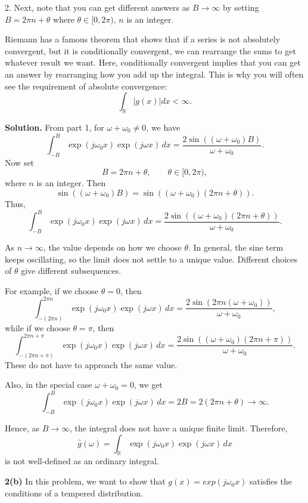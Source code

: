 \documentclass[11pt]{article}
\begin{document}
	\newpage
	
	2. Next, note that you can get different answers as $B \to \infty$ by setting $B = 2\pi n + \theta$ where $\theta \in [0, 2\pi)$, $n$ is an integer.
	
	Riemann has a famous theorem that shows that if a series is not absolutely convergent, but it is conditionally convergent, we can rearrange the sums to get whatever result we want. Here, conditionally convergent implies that you can get an answer by rearranging how you add up the integral. This is why you will often see the requirement of absolute convergence:
	\[
	\int_{\mathbb{R}} |g(x)| dx < \infty.
	\]
	
	\textbf{Solution.}
	From part 1, for \(\omega+\omega_0\neq 0\), we have
	\[
	\int_{-B}^{B}\exp(j\omega_0 x)\exp(j\omega x)\,dx
	=
	\frac{2\sin\!\left((\omega+\omega_0)B\right)}{\omega+\omega_0}.
	\]
	Now set
	\[
	B=2\pi n+\theta, \qquad \theta\in[0,2\pi),
	\]
	where \(n\) is an integer. Then
	\[
	\sin\!\left((\omega+\omega_0)B\right)
	=
	\sin\!\left((\omega+\omega_0)(2\pi n+\theta)\right).
	\]
	Thus,
	\[
	\int_{-B}^{B}\exp(j\omega_0 x)\exp(j\omega x)\,dx
	=
	\frac{2\sin\!\left((\omega+\omega_0)(2\pi n+\theta)\right)}{\omega+\omega_0}.
	\]
	
	As \(n\to\infty\), the value depends on how we choose \(\theta\). In general, the sine term keeps oscillating, so the limit does not settle to a unique value. Different choices of \(\theta\) give different subsequences.
	
	For example, if we choose \(\theta=0\), then
	\[
	\int_{-(2\pi n)}^{2\pi n}\exp(j\omega_0 x)\exp(j\omega x)\,dx
	=
	\frac{2\sin\!\left(2\pi n(\omega+\omega_0)\right)}{\omega+\omega_0},
	\]
	while if we choose \(\theta=\pi\), then
	\[
	\int_{-(2\pi n+\pi)}^{2\pi n+\pi}\exp(j\omega_0 x)\exp(j\omega x)\,dx
	=
	\frac{2\sin\!\left((\omega+\omega_0)(2\pi n+\pi)\right)}{\omega+\omega_0}.
	\]
	These do not have to approach the same value.
	
	Also, in the special case \(\omega+\omega_0=0\), we get
	\[
	\int_{-B}^{B}\exp(j\omega_0 x)\exp(j\omega x)\,dx
	=
	2B
	=
	2(2\pi n+\theta)\to\infty.
	\]
	
	Hence, as \(B\to\infty\), the integral does not have a unique finite limit. Therefore,
	\[
	\hat g(\omega)=\int_{\mathbb R}\exp(j\omega_0 x)\exp(j\omega x)\,dx
	\]
	is not well-defined as an ordinary integral.
	
	\newpage
	
	\textbf{2(b)} In this problem, we want to show that $g(x) = exp(j\omega_0 x)$ satisfies the conditions of a tempered distribution.
	
\end{document}
